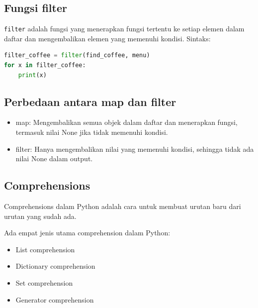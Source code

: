 \documentclass{article}
\begin{document}
\subsection{Fungsi filter}
\verb|filter| adalah fungsi yang menerapkan fungsi tertentu ke setiap elemen dalam daftar dan mengembalikan elemen yang memenuhi kondisi.
Sintaks:
\begin{lstlisting}[language=Python, caption={}, captionpos=b]
filter_coffee = filter(find_coffee, menu)
for x in filter_coffee:
    print(x)
\end{lstlisting}

\subsection{Perbedaan antara map dan filter}
\begin{itemize}
    \item map: Mengembalikan semua objek dalam daftar dan menerapkan fungsi, termasuk nilai None jika tidak memenuhi kondisi.
    \item filter: Hanya mengembalikan nilai yang memenuhi kondisi, sehingga tidak ada nilai None dalam output.
\end{itemize}

\subsection{Comprehensions}
Comprehensions dalam Python adalah cara untuk membuat urutan baru dari urutan yang sudah ada.

Ada empat jenis utama comprehension dalam Python:
\begin{itemize}
    \item List comprehension
    \item Dictionary comprehension
    \item Set comprehension
    \item Generator comprehension
\end{itemize}
\end{document}

